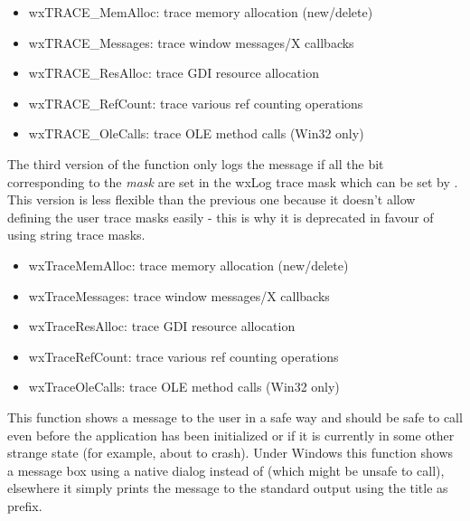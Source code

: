 \begin{itemize}\itemsep=0pt
\item wxTRACE\_MemAlloc: trace memory allocation (new/delete)
\item wxTRACE\_Messages: trace window messages/X callbacks
\item wxTRACE\_ResAlloc: trace GDI resource allocation
\item wxTRACE\_RefCount: trace various ref counting operations
\item wxTRACE\_OleCalls: trace OLE method calls (Win32 only)
\end{itemize}

The third version of the function only logs the message if all the bit
corresponding to the {\it mask} are set in the wxLog trace mask which can be
set by . This version is less
flexible than the previous one because it doesn't allow defining the user
trace masks easily - this is why it is deprecated in favour of using string
trace masks.

\begin{itemize}\itemsep=0pt
\item wxTraceMemAlloc: trace memory allocation (new/delete)
\item wxTraceMessages: trace window messages/X callbacks
\item wxTraceResAlloc: trace GDI resource allocation
\item wxTraceRefCount: trace various ref counting operations
\item wxTraceOleCalls: trace OLE method calls (Win32 only)
\end{itemize}


\label{wxsafeshowmessage}


This function shows a message to the user in a safe way and should be safe to
call even before the application has been initialized or if it is currently in
some other strange state (for example, about to crash). Under Windows this
function shows a message box using a native dialog instead of
 (which might be unsafe to call), elsewhere
it simply prints the message to the standard output using the title as prefix.



